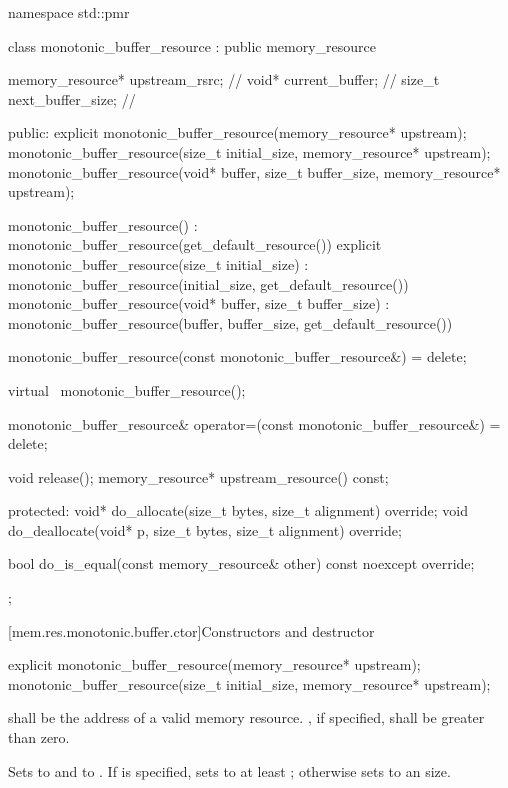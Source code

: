 %
\begin{codeblock}
namespace std::pmr {
  class monotonic_buffer_resource : public memory_resource {
    memory_resource* upstream_rsrc;     // \expos
    void* current_buffer;               // \expos
    size_t next_buffer_size;            // \expos

  public:
    explicit monotonic_buffer_resource(memory_resource* upstream);
    monotonic_buffer_resource(size_t initial_size, memory_resource* upstream);
    monotonic_buffer_resource(void* buffer, size_t buffer_size, memory_resource* upstream);

    monotonic_buffer_resource()
        : monotonic_buffer_resource(get_default_resource()) {}
    explicit monotonic_buffer_resource(size_t initial_size)
        : monotonic_buffer_resource(initial_size, get_default_resource()) {}
    monotonic_buffer_resource(void* buffer, size_t buffer_size)
        : monotonic_buffer_resource(buffer, buffer_size, get_default_resource()) {}

    monotonic_buffer_resource(const monotonic_buffer_resource&) = delete;

    virtual ~monotonic_buffer_resource();

    monotonic_buffer_resource& operator=(const monotonic_buffer_resource&) = delete;

    void release();
    memory_resource* upstream_resource() const;

  protected:
    void* do_allocate(size_t bytes, size_t alignment) override;
    void do_deallocate(void* p, size_t bytes, size_t alignment) override;

    bool do_is_equal(const memory_resource& other) const noexcept override;
  };
}
\end{codeblock}

[mem.res.monotonic.buffer.ctor]{Constructors and destructor}

%
\begin{itemdecl}
explicit monotonic_buffer_resource(memory_resource* upstream);
monotonic_buffer_resource(size_t initial_size, memory_resource* upstream);
\end{itemdecl}

\begin{itemdescr}
\pnum
\requires
{} shall be the address of a valid memory resource.
, if specified, shall be greater than zero.

\pnum
\effects
Sets  to  and
 to .
If  is specified,
sets  to at least ;
otherwise sets  to an
 size.
\end{itemdescr}

